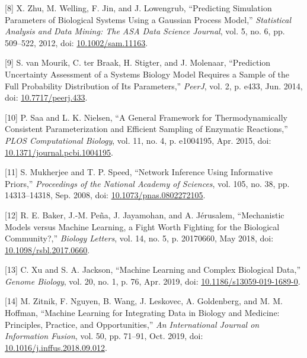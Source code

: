 \documentclass[11pt]{article}
\begin{document}
\hypertarget{citeproc_bib_item_8}{[8] X. Zhu, M. Welling, F. Jin, and J. Lowengrub, “Predicting Simulation Parameters of Biological Systems Using a Gaussian Process Model,” \textit{Statistical Analysis and Data Mining: The ASA Data Science Journal}, vol. 5, no. 6, pp. 509–522, 2012, doi: \href{https://doi.org/10.1002/sam.11163}{10.1002/sam.11163}.}

\hypertarget{citeproc_bib_item_9}{[9] S. van Mourik, C. ter Braak, H. Stigter, and J. Molenaar, “Prediction Uncertainty Assessment of a Systems Biology Model Requires a Sample of the Full Probability Distribution of Its Parameters,” \textit{PeerJ}, vol. 2, p. e433, Jun. 2014, doi: \href{https://doi.org/10.7717/peerj.433}{10.7717/peerj.433}.}

\hypertarget{citeproc_bib_item_10}{[10] P. Saa and L. K. Nielsen, “A General Framework for Thermodynamically Consistent Parameterization and Efficient Sampling of Enzymatic Reactions,” \textit{PLOS Computational Biology}, vol. 11, no. 4, p. e1004195, Apr. 2015, doi: \href{https://doi.org/10.1371/journal.pcbi.1004195}{10.1371/journal.pcbi.1004195}.}

\hypertarget{citeproc_bib_item_11}{[11] S. Mukherjee and T. P. Speed, “Network Inference Using Informative Priors,” \textit{Proceedings of the National Academy of Sciences}, vol. 105, no. 38, pp. 14313–14318, Sep. 2008, doi: \href{https://doi.org/10.1073/pnas.0802272105}{10.1073/pnas.0802272105}.}

\hypertarget{citeproc_bib_item_12}{[12] R. E. Baker, J.-M. Peña, J. Jayamohan, and A. Jérusalem, “Mechanistic Models versus Machine Learning, a Fight Worth Fighting for the Biological Community?,” \textit{Biology Letters}, vol. 14, no. 5, p. 20170660, May 2018, doi: \href{https://doi.org/10.1098/rsbl.2017.0660}{10.1098/rsbl.2017.0660}.}

\hypertarget{citeproc_bib_item_13}{[13] C. Xu and S. A. Jackson, “Machine Learning and Complex Biological Data,” \textit{Genome Biology}, vol. 20, no. 1, p. 76, Apr. 2019, doi: \href{https://doi.org/10.1186/s13059-019-1689-0}{10.1186/s13059-019-1689-0}.}

\hypertarget{citeproc_bib_item_14}{[14] M. Zitnik, F. Nguyen, B. Wang, J. Leskovec, A. Goldenberg, and M. M. Hoffman, “Machine Learning for Integrating Data in Biology and Medicine: Principles, Practice, and Opportunities,” \textit{An International Journal on Information Fusion}, vol. 50, pp. 71–91, Oct. 2019, doi: \href{https://doi.org/10.1016/j.inffus.2018.09.012}{10.1016/j.inffus.2018.09.012}.}
\end{document}
